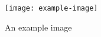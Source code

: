 \documentclass{article}
\begin{document}
    \begin{figure}[h]
        \centering
        \texttt{[image: example-image]}
        \caption{An example image}
        \label{fig::example}
    \end{figure}
\end{document}
